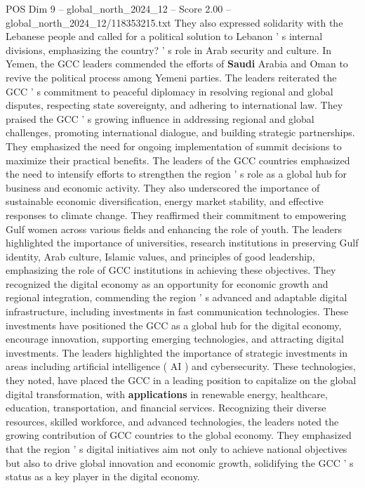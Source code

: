 \begin{textsample}{POS Dim 9 – global\_north\_2024\_12 – Score 2.00 – global\_north\_2024\_12/118353215.txt}
They also expressed solidarity with the Lebanese people and called for a political solution to Lebanon ' s internal divisions, emphasizing the country? ' s role in Arab security and culture.
In Yemen, the GCC leaders commended the efforts of \textbf{Saudi} Arabia and Oman to revive the political process among Yemeni parties.
The leaders reiterated the GCC ' s commitment to peaceful diplomacy in resolving regional and global disputes, respecting state sovereignty, and adhering to international law.
They praised the GCC ' s growing influence in addressing regional and global challenges, promoting international dialogue, and building strategic partnerships.
They emphasized the need for ongoing implementation of summit decisions to maximize their practical benefits.
The leaders of the GCC countries emphasized the need to intensify efforts to strengthen the region ' s role as a global hub for business and economic activity.
They also underscored the importance of sustainable economic diversification, energy market stability, and effective responses to climate change.
They reaffirmed their commitment to empowering Gulf women across various fields and enhancing the role of youth.
The leaders highlighted the importance of universities, research institutions in preserving Gulf identity, Arab culture, Islamic values, and principles of good leadership, emphasizing the role of GCC institutions in achieving these objectives.
They recognized the digital economy as an opportunity for economic growth and regional integration, commending the region ' s advanced and adaptable digital infrastructure, including investments in fast communication technologies.
These investments have positioned the GCC as a global hub for the digital economy, encourage innovation, supporting emerging technologies, and attracting digital investments.
The leaders highlighted the importance of strategic investments in areas including artificial intelligence ( AI ) and cybersecurity.
These technologies, they noted, have placed the GCC in a leading position to capitalize on the global digital transformation, with \textbf{applications} in renewable energy, healthcare, education, transportation, and financial services.
Recognizing their diverse resources, skilled workforce, and advanced technologies, the leaders noted the growing contribution of GCC countries to the global economy.
They emphasized that the region ' s digital initiatives aim not only to achieve national objectives but also to drive global innovation and economic growth, solidifying the GCC ' s status as a key player in the digital economy.

\end{textsample}
